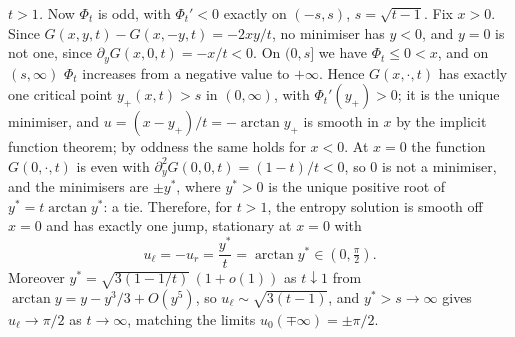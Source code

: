 \emph{$t>1$.} Now $\Phi_t$ is odd, with $\Phi_t'<0$ exactly on $(-s,s)$,
$s=\sqrt{t-1}$. Fix $x>0$. Since $G(x,y,t)-G(x,-y,t)=-2xy/t$, no minimiser has
$y<0$, and $y=0$ is not one, since $\partial_yG(x,0,t)=-x/t<0$. On $(0,s]$ we
have $\Phi_t\le0<x$, and on $(s,\infty)$ $\Phi_t$ increases from a negative value
to $+\infty$. Hence $G(x,\cdot,t)$ has exactly one critical point
$y_+(x,t)>s$ in $(0,\infty)$, with $\Phi_t'(y_+)>0$; it is the unique
minimiser, and $u=(x-y_+)/t=-\arctan y_+$ is smooth in $x$ by the implicit
function theorem; by oddness the same holds for $x<0$. At $x=0$ the function
$G(0,\cdot,t)$ is even with $\partial_y^2G(0,0,t)=(1-t)/t<0$, so $0$ is not a
minimiser, and the minimisers are $\pm y^*$, where $y^*>0$ is the unique
positive root of $y^*=t\arctan y^*$: a tie. Therefore, for $t>1$, the entropy
solution is smooth off $x=0$ and has exactly one jump, stationary at $x=0$ with
\begin{equation*}
  u_\ell=-u_r=\frac{y^*}{t}=\arctan y^*\in(0,\tfrac\pi2).
\end{equation*}
Moreover $y^*=\sqrt{3(1-1/t)}\,(1+o(1))$ as $t\downarrow1$ from
$\arctan y=y-y^3/3+O(y^5)$, so $u_\ell\sim\sqrt{3(t-1)}$, and $y^*>s\to\infty$
gives $u_\ell\to\pi/2$ as $t\to\infty$, matching the limits $u_0(\mp\infty)=\pm\pi/2$.